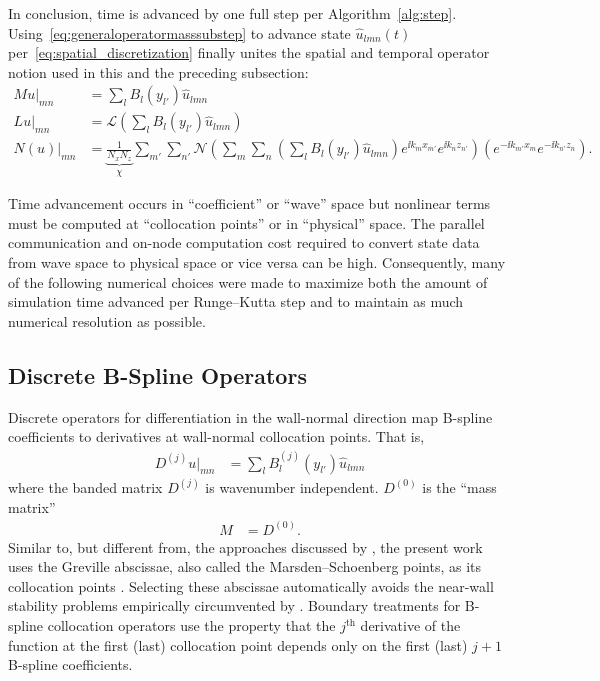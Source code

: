 In conclusion, time is advanced by one full step per Algorithm~\ref{alg:step}.
Using~\eqref{eq:generaloperatormasssubstep} to advance state $\hat{u}_{l m
n}(t)$ per~\eqref{eq:spatial_discretization} finally unites the spatial and
temporal operator notion used in this and the preceding subsection:
\begin{subequations}
\label{eq:uniteddiscretization}
\begin{align}
   M u\bigr|_{m n}
&= \sum_{l} B_l\!\left(y_{l'}\right)
   \hat{u}_{l m n}
\\
   \left.{L} u\right|_{m n}
&= \mathscr{L}\left(
     \sum_{l}
     B_l\!\left(y_{l'}\right)
     \hat{u}_{l m n}
   \right)
\\
   \left.{N}\!\left(u\right)\right|_{m n}
&= \underbrace{\frac{1}{N_x N_z}}_{\chi}
   \sum_{m'} \sum_{n'}
   \mathscr{N}\left(
     \sum_{m}
     \sum_{n}
     \left(
       \sum_{l} B_l\!\left(y_{l'}\right)
       \hat{u}_{l m n}
     \right)
     e^{\ii k_m x_{m'}}e^{\ii k_n z_{n'}}
   \right)
   \left(
     e^{-\ii k_{m'} x_m}e^{-\ii k_{n'} z_n}
   \right).
\end{align}
\end{subequations}

Time advancement occurs in ``coefficient'' or ``wave'' space but nonlinear terms
must be computed at ``collocation points'' or in ``physical'' space.  The parallel
communication and on-node computation cost required to convert state data from
wave space to physical space or vice versa can be high.  Consequently, many of
the following numerical choices were made to maximize both the amount of
simulation time advanced per Runge--Kutta step and to maintain as much numerical
resolution as possible.

\subsection{Discrete B-Spline Operators}
\label{sec:bsplineoperators}

Discrete operators for differentiation in the wall-normal direction map
B-spline coefficients to derivatives at wall-normal collocation points.  That
is,
\begin{align}
  D^{(j)} u\bigr|_{m n}
&= \sum_{l} B^{(j)}_l\!\left(y_{l'}\right)
   \hat{u}_{l m n}
\end{align}
where the banded matrix $D^{(j)}$ is wavenumber independent.  $D^{(0)}$ is
the ``mass matrix''
\begin{align}
  M &= D^{(0)}.
\end{align}
Similar to, but different from, the approaches discussed by
\citet[\textsection{}2.1.3]{Kwok2001}, the present work uses the Greville
abscissae, also called the Marsden--Schoenberg points, as its collocation points
\citep{Johnson2005Higher,Botella2003Bspline}.  Selecting these abscissae
automatically avoids the near-wall stability problems empirically circumvented
by \citet[\textsection{}4.4]{Kwok2001}.  Boundary treatments for B-spline
collocation operators use the property that the $j^\mathrm{th}$ derivative of the function
at the first (last) collocation point depends only on the first (last) $j+1$
B-spline coefficients.

